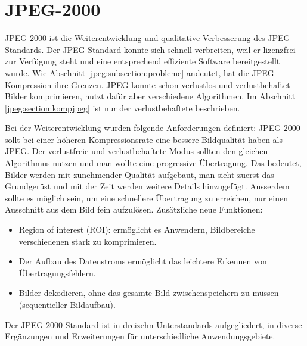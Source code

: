 %
%
%
%
\section{JPEG-2000 
\label{jpeg:section:jpeg2000}}
JPEG-2000 ist die Weiterentwicklung und qualitative Verbesserung des JPEG-Standards.
%
Der JPEG-Standard konnte sich schnell verbreiten, weil er lizenzfrei zur Verfügung steht und eine entsprechend effiziente Software bereitgestellt wurde.
Wie Abschnitt \ref{jpeg:subsection:probleme} andeutet, hat die JPEG Kompression ihre Grenzen.
JPEG konnte schon verlustlos und verlustbehaftet Bilder komprimieren, nutzt dafür aber verschiedene Algorithmen.
Im Abschnitt \ref{jpeg:section:kompjpeg} ist nur der verlustbehaftete beschrieben.

Bei der Weiterentwicklung wurden folgende Anforderungen definiert:
JPEG-2000 sollt bei einer höheren Kompressionsrate eine bessere Bildqualität haben als JPEG.
Der verlustfreie und verlustbehaftete Modus sollten den gleichen Algorithmus nutzen und man wollte eine progressive Übertragung.
Das bedeutet, Bilder werden mit zunehmender Qualität aufgebaut, man sieht zuerst das Grundgerüst und mit der Zeit werden weitere Details hinzugefügt.
Ausserdem sollte es möglich sein, um eine schnellere Übertragung zu erreichen, nur einen Ausschnitt aus dem Bild fein aufzulösen.
Zusätzliche neue Funktionen:
\begin{itemize}
    \item Region of interest (ROI): ermöglicht es Anwendern, Bildbereiche verschiedenen stark zu komprimieren.
    \item Der Aufbau des Datenstroms ermöglicht das leichtere Erkennen von Übertragungsfehlern.
    \item Bilder dekodieren, ohne das gesamte Bild zwischenspeichern zu müssen (sequentieller Bildaufbau).
\end{itemize}
Der JPEG-2000-Standard ist in dreizehn Unterstandards aufgegliedert, in diverse Ergänzungen und Erweiterungen für unterschiedliche Anwendungsgebiete. 


